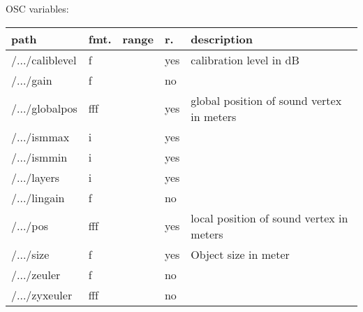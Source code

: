 \begin{snugshade}
{\footnotesize
\label{osctab:soundt}
OSC variables:
\nopagebreak

\begin{tabularx}{\textwidth}{llllX}
\hline
path & fmt. & range & r. & description\\
\hline
/.../caliblevel & f &  & yes & calibration level in dB\\
/.../gain & f &  & no & \\
/.../globalpos & fff &  & yes & global position of sound vertex in meters\\
/.../ismmax & i &  & yes & \\
/.../ismmin & i &  & yes & \\
/.../layers & i &  & yes & \\
/.../lingain & f &  & no & \\
/.../pos & fff &  & yes & local position of sound vertex in meters\\
/.../size & f &  & yes & Object size in meter\\
/.../zeuler & f &  & no & \\
/.../zyxeuler & fff &  & no & \\
\hline
\end{tabularx}
}
\end{snugshade}
